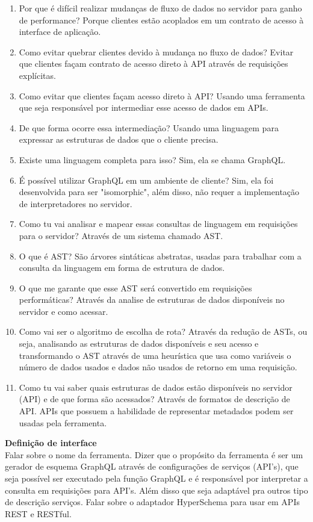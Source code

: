 \begin{enumerate}
\item Por que é difícil realizar mudanças de fluxo de dados no servidor para ganho de performance? Porque clientes estão acoplados em um contrato de acesso à interface de aplicação.
\item Como evitar quebrar clientes devido à mudança no fluxo de dados? Evitar que clientes façam contrato de acesso direto à API através de requisições explícitas.
\item Como evitar que clientes façam acesso direto à API? Usando uma ferramenta que seja responsável por intermediar esse acesso de dados em APIs.
\item De que forma ocorre essa intermediação? Usando uma linguagem para expressar as estruturas de dados que o cliente precisa.
\item Existe uma linguagem completa para isso? Sim, ela se chama GraphQL.
\item É possível utilizar GraphQL em um ambiente de cliente? Sim, ela foi desenvolvida para ser "isomorphic", além disso, não requer a implementação de interpretadores no servidor.
\item Como tu vai analisar e mapear essas consultas de linguagem em requisições para o servidor? Através de um sistema chamado AST.
\item O que é AST? São árvores sintáticas abstratas, usadas para trabalhar com a consulta da linguagem em forma de estrutura de dados.
\item O que me garante que esse AST será convertido em requisições performáticas? Através da analise de estruturas de dados disponíveis no servidor e como acessar.
\item Como vai ser o algoritmo de escolha de rota? Através da redução de ASTs, ou seja, analisando as estruturas de dados disponíveis e seu acesso e transformando o AST através de uma heurística que usa como variáveis o número de dados usados e dados não usados de retorno em uma requisição.
\item Como tu vai saber quais estruturas de dados estão disponíveis no servidor (API) e de que forma são acessados? Através de formatos de descrição de API. APIs que possuem a habilidade de representar metadados podem ser usadas pela ferramenta.
\end{enumerate}

\textbf{Definição de interface} \\

Falar sobre o nome da ferramenta. Dizer que o propósito da ferramenta é ser um gerador de esquema GraphQL através de configurações de serviços (API's), que seja possível ser executado pela função GraphQL e é responsável por interpretar a consulta em requisições para API's. Além disso que seja adaptável pra outros tipo de descrição serviços. Falar sobre o adaptador HyperSchema para usar em APIs REST e RESTful.

